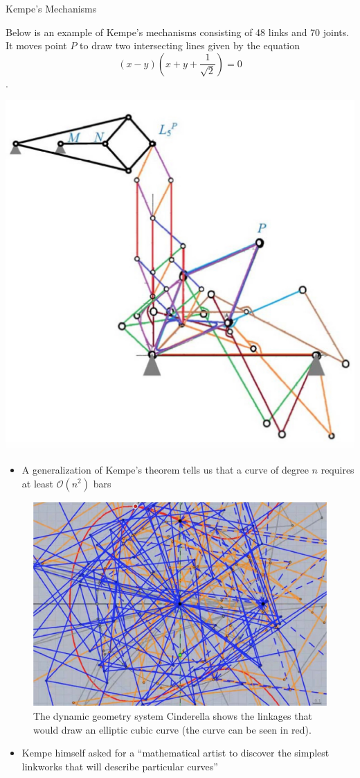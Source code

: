 \documentclass{beamer}
\begin{document}
\begin{frame}{}
\begin{columns}[t]
\begin{column}{0.3\linewidth}
\begin{block}{Kempe's Mechanisms}
\begin{center}
\begin{figure}
	\end{figure}
\end{center}

\vspace{1em}

Below is an example of Kempe's mechanisms consisting of 48 links and 70 joints. It moves point $P$ to draw two intersecting lines given by the equation $$ (x-y)(x+y+\frac{1}{\sqrt{2}})=0 $$.

\begin{center}
	\includegraphics[width=0.4\columnwidth]{kempe_linkage}
\end{center}

\vspace{1em}

\begin{itemize}
\item A generalization of Kempe's theorem tells us that a curve of degree $n$ requires at least $\mathcal{O}(n^2)$ bars
\end{itemize}

\begin{center}
	\begin{figure}
	\includegraphics[width=0.4\columnwidth]{quad-curve}
	\caption{The dynamic geometry system Cinderella shows the linkages that would draw an elliptic cubic curve (the curve can be seen in red).}
	\end{figure}
\end{center}

\vspace{1em}
\begin{itemize}
\item Kempe himself asked for a “mathematical artist to discover the simplest linkworks that will describe particular curves”
\end{itemize}


\end{block}
\end{column}
\end{columns}
\end{frame}
\end{document}

